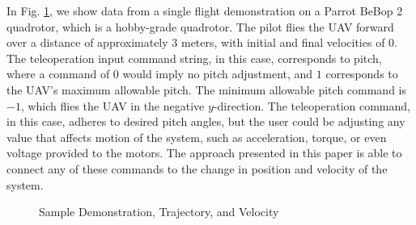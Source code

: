 \documentclass[letterpaper, 10 pt, conference]{ieeeconf}  %
\newcommand\NB[1]{$\spadesuit$\footnote{NB: #1}}
\begin{document}
In Fig. \ref{fig:samps}, we show data from a single flight demonstration on a Parrot BeBop 2 quadrotor, which is a hobby-grade quadrotor. The pilot flies the UAV forward over a distance of approximately $3$ meters, with initial and final velocities of $0$. The teleoperation input command string, in this case, corresponds to pitch, where a command of $0$ would imply no pitch adjustment, and $1$ corresponds to the UAV's maximum allowable pitch. The minimum allowable pitch command is $-1$, which flies the UAV in the negative $y$-direction. The teleoperation command, in this case, adheres to desired pitch angles, but the user could be adjusting any value that affects motion of the system, such as acceleration, torque, or even voltage provided to the motors. The approach presented in this paper is able to connect any of these commands to the change in position and velocity of the system. 
\begin{figure}[ht]
	\centering
	\caption{Sample Demonstration, Trajectory, and Velocity}
	\label{fig:samps}
\end{figure}
\end{document}
